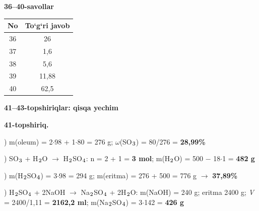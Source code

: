 \documentclass[11pt,a4paper]{article}
\renewcommand{\textsubscript}[1]{\ensuremath{_{\text{\fontsize{8}{8}\selectfont #1}}}}
\begin{document}
\noindent\textbf{36--40-savollar}\par\smallskip
\noindent\begin{tabular}{|c|c|}\hline \textbf{No} & \textbf{To`g`ri javob}\\\hline
36 & 26\\\hline
37 & 1,6\\\hline
38 & 5,6\\\hline
39 & 11,88\\\hline
40 & 62,5\\\hline
\end{tabular}\par\medskip
\noindent\textbf{41--43-topshiriqlar: qisqa yechim}\par\smallskip
\noindent\textbf{41-topshiriq.}\par
{}) m(oleum) = 2$\cdot$98 + 1$\cdot$80 = 276 g; $\omega$(SO\textsubscript{3}) = 80/276 = \textbf{28,99\%}\par
{}) SO\textsubscript{3} + H\textsubscript{2}O $\to$ H\textsubscript{2}SO\textsubscript{4}: n = 2 + 1 = \textbf{3 mol}; m(H\textsubscript{2}O) = 500 $-$ 18$\cdot$1 = \textbf{482 g}\par
{}) m(H\textsubscript{2}SO\textsubscript{4}) = 3$\cdot$98 = 294 g; m(eritma) = 276 + 500 = 776 g $\to$ \textbf{37,89\%}\par
{}) H\textsubscript{2}SO\textsubscript{4} + 2NaOH $\to$ Na\textsubscript{2}SO\textsubscript{4} + 2H\textsubscript{2}O: m(NaOH) = 240 g; eritma 2400 g; \textit{V} = 2400/1,11 = \textbf{2162,2 ml}; m(Na\textsubscript{2}SO\textsubscript{4}) = 3$\cdot$142 = \textbf{426 g}\par
\end{document}
